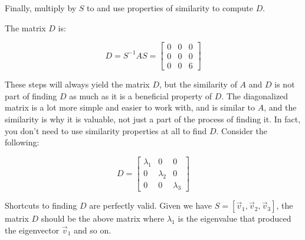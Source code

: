 \documentclass[11pt]{article}
\begin{document}
Finally, multiply by $S$ to and use properties of similarity to compute $D$.

\newpage
The matrix $D$ is:

$$D=S^{-1}AS=\begin{bmatrix}0 & 0 & 0\\0 & 0 & 0\\0 & 0 & 6\end{bmatrix}$$

These steps will always yield the matrix $D$, but the similarity of $A$ and $D$ is not part of finding $D$ as much as it is a beneficial property of $D$. The diagonalized matrix is a lot more simple and easier to work with, and is similar to $A$, and the similarity is why it is valuable, not just a part of the process of finding it. In fact, you don't need to use similarity properties at all to find $D$. Consider the following:

$$D=\begin{bmatrix}
\lambda_1 & 0 & 0\\
0 & \lambda_2 & 0\\
0 & 0 & \lambda_3
\end{bmatrix}$$

Shortcuts to finding $D$ are perfectly valid. Given we have $S=[\vec{v}_1,\vec{v}_2,\vec{v}_3]$, the matrix $D$ should be the above matrix where $\lambda_1$ is the eigenvalue that produced the eigenvector $\vec{v}_1$ and so on.
\end{document}
